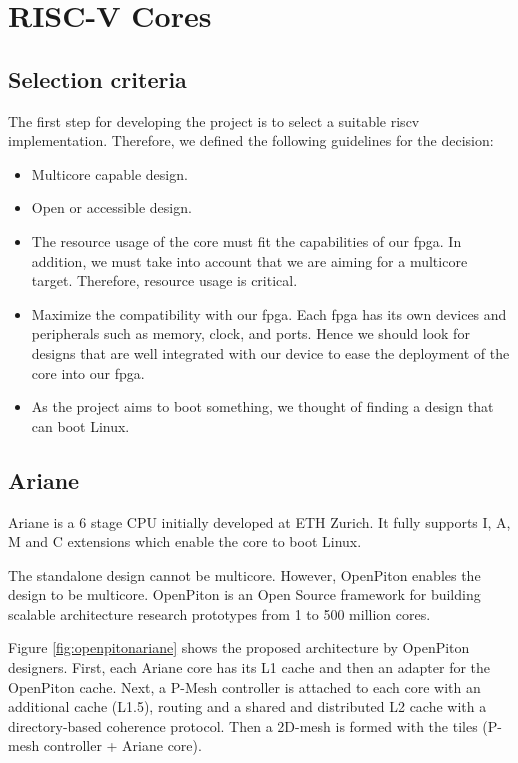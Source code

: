 \section{RISC-V Cores}

\subsection{Selection criteria}
The first step for developing the project is to select a suitable riscv implementation. Therefore, we defined the following guidelines for the decision:
\begin{itemize}
\item Multicore capable design.
\item Open or accessible design.
\item The resource usage of the core must fit the capabilities of our \gls{fpga}. In addition, we must take into account that we are aiming for a multicore target. Therefore, resource usage is critical.
\item Maximize the compatibility with our \gls{fpga}. Each \gls{fpga} has its own devices and peripherals such as memory, clock, and ports. Hence we should look for designs that are well integrated with our device to ease the deployment of the core into our \gls{fpga}.
\item As the project aims to boot something, we thought of finding a design that can boot Linux.
\end{itemize}

\subsection{Ariane}
Ariane\cite{arianecore} is a 6 stage CPU initially developed at ETH Zurich. It fully supports I, A, M and C extensions which enable the core to boot Linux.

The standalone design cannot be multicore. However, OpenPiton enables the design to be multicore. OpenPiton\cite{openpiton} is an Open Source framework for building scalable architecture research prototypes from 1 to 500 million cores.

Figure \ref{fig:openpitonariane} shows the proposed architecture by OpenPiton designers. First, each Ariane core has its L1 cache and then an adapter for the OpenPiton cache. Next, a P-Mesh controller is attached to each core with an additional cache (L1.5), routing and a shared and distributed L2 cache with a directory-based coherence protocol. Then a 2D-mesh is formed with the tiles (P-mesh controller + Ariane core). 

